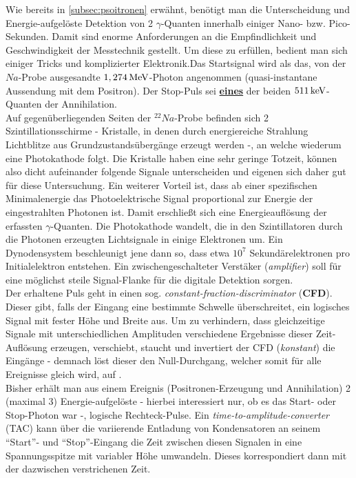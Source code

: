 \documentclass[numbers=noenddot,a4paper]{scrartcl}
\newcommand{\tenpo}[1]{ 10^{#1}}
\newcommand{\tilt}[1]{\textit{#1}}
\begin{document}
			Wie bereits in \ref{subsec:psoitronen} erwähnt, benötigt man die Unterscheidung und Energie-aufgelöste Detektion von 2 $\gamma$-Quanten innerhalb einiger Nano- bzw. Pico-Sekunden. Damit sind enorme Anforderungen an die Empfindlichkeit und Geschwindigkeit der Messtechnik gestellt. Um diese zu erfüllen, bedient man sich einiger Tricks und komplizierter Elektronik.Das Startsignal wird als das, von der $Na$-Probe ausgesandte $\unit[1,274]{MeV}$-Photon angenommen (quasi-instantane Aussendung mit dem Positron). Der Stop-Puls sei \underline{\textbf{eines}} der beiden $\unit[511]{keV}$-Quanten der Annihilation.\\
			Auf gegenüberliegenden Seiten der $^{22}Na$-Probe befinden sich 2 Szintillationsschirme - Kristalle, in denen durch energiereiche Strahlung Lichtblitze aus Grundzustandsübergänge erzeugt werden -, an welche wiederum eine Photokathode folgt. Die Kristalle haben eine sehr geringe Totzeit, können also dicht aufeinander folgende Signale unterscheiden und eigenen sich daher gut für diese Untersuchung. Ein weiterer Vorteil ist, dass ab einer spezifischen Minimalenergie das Photoelektrische Signal proportional zur Energie der eingestrahlten Photonen ist. Damit erschließt sich eine Energieauflösung der erfassten $\gamma$-Quanten. Die Photokathode wandelt, die in den Szintillatoren durch die Photonen erzeugten Lichtsignale in einige Elektronen um. Ein Dynodensystem beschleunigt jene dann so, dass etwa $\tenpo{7}$ Sekundärelektronen pro Initialelektron entstehen. Ein zwischengeschalteter Verstäker (\tilt{amplifier}) soll für eine möglichst steile Signal-Flanke für die digitale Detektion sorgen.\\
			Der erhaltene Puls geht in einen sog. \tilt{constant-fraction-discriminator} (\textbf{CFD}). Dieser gibt, falls der Eingang eine bestimmte Schwelle überschreitet, ein logisches Signal mit fester Höhe und Breite aus. Um zu verhindern, dass gleichzeitige Signale mit unterschiedlichen Amplituden verschiedene Ergebnisse dieser Zeit-Auflösung erzeugen, verschiebt, staucht und invertiert der CFD (\tilt{konstant}) die Eingänge - demnach löst dieser den Null-Durchgang, welcher somit für alle Ereignisse gleich wird, auf \cite{TUDarmstadtPET}.\\
			Bisher erhält man aus einem Ereignis (Positronen-Erzeugung und Annihilation) 2 (maximal 3) Energie-aufgelöste - hierbei interessiert nur, ob es das Start- oder Stop-Photon war -, logische Rechteck-Pulse. Ein \tilt{time-to-amplitude-converter} (TAC) kann über die variierende Entladung von Kondensatoren an seinem "`Start"'- und "`Stop"'-Eingang die Zeit zwischen diesen Signalen in eine Spannungsspitze mit variabler Höhe umwandeln. Dieses korrespondiert dann mit der dazwischen verstrichenen Zeit.\\
\end{document}
